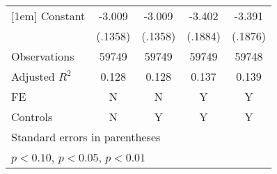 \begin{table}[htbp]
\begin{tabular}{l*{4}{c}}
[1em]
Constant            &      -3.009\sym{***}&      -3.009\sym{***}&      -3.402\sym{***}&      -3.391\sym{***}\\
                    &     (.1358)         &     (.1358)         &     (.1884)         &     (.1876)         \\
\hline
Observations        &       59749         &       59749         &       59749         &       59748         \\
Adjusted \(R^{2}\)  &       0.128         &       0.128         &       0.137         &       0.139         \\
FE                  &           N         &           N         &           Y         &           Y         \\
Controls            &           N         &           Y         &           Y         &           Y         \\
\hline\hline
\multicolumn{5}{l}{\footnotesize Standard errors in parentheses}\\
\multicolumn{5}{l}{\footnotesize \sym{*} \(p<0.10\), \sym{**} \(p<0.05\), \sym{***} \(p<0.01\)}\\
\end{tabular}
\end{table}

